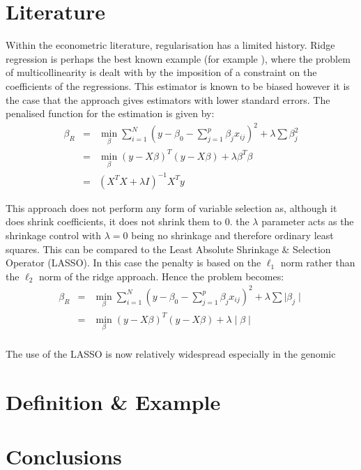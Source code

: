 \documentclass[11pt]{article}
\begin{document}
\section{Literature}
Within the econometric literature, regularisation has a limited history. Ridge regression is perhaps the best known example (for example \cite{hoerl1970}), where the problem of multicollinearity is dealt with by the imposition of a constraint on the coefficients of the regressions. This estimator is known to be biased however it is the case that the approach gives estimators with lower standard errors. The penalised function for the estimation is given by:
\begin{eqnarray}
\beta_R&=&\min_\beta \sum_{i=1}^N(y-\beta_0-\sum_{j=1}^p \beta_j x_{ij})^2+\lambda \sum \beta_j^2\\
&=&\min_\beta \left(y-X\beta\right)^T\left(y-X\beta\right)+\lambda\beta^T\beta \nonumber \\
&=&\left(X^TX+\lambda I\right)^{-1}X^T y \nonumber
\end{eqnarray}

This approach does not perform any form of variable selection  as, although it does shrink coefficients, it does not shrink them to 0. the $\lambda$ parameter acts as the shrinkage control with $\lambda=0$ being no shrinkage and therefore ordinary least squares. This can be compared to the Least Absolute Shrinkage \& Selection Operator (LASSO). In this case the penalty is based on the $\ell_1$ norm rather than the $\ell_2$ norm of the ridge approach. Hence the problem becomes:
\begin{eqnarray}
\beta_R&=&\min_\beta \sum_{i=1}^N(y-\beta_0-\sum_{j=1}^p \beta_j x_{ij})^2+\lambda \sum \mid\beta_j\mid\\
&=&\min_\beta \left(y-X\beta\right)^T\left(y-X\beta\right)+\lambda\mid\beta\mid \nonumber \\
\end{eqnarray}

The use of the LASSO is now relatively widespread especially in the genomic 


\section{Definition \& Example}

\section{Conclusions}




\end{document}

